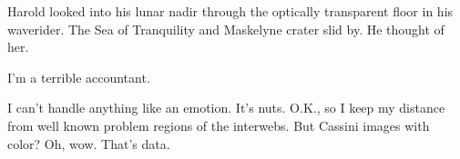 \break

Harold looked into his lunar nadir through the optically transparent
floor in his waverider.  The Sea of Tranquility and Maskelyne crater
slid by.  He thought of her.

\break

I'm a terrible accountant.


\break

I can't handle anything like an emotion.  It's nuts.  O.K., so I keep
my distance from well known problem regions of the interwebs.  But
Cassini images with color?  Oh, wow.  That's data.




\bye
